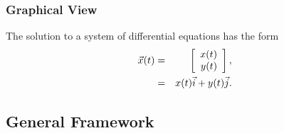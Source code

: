 \begin{frame}
    \frametitle{Graphical View}

  The solution to a system of differential equations has the form
  \begin{eqnarray*}
    \vec{x}(t) & = & \left[ \begin{array}{r} x(t) \\ y(t) \end{array} \right], \\
    & = & x(t) \vec{i} + y(t)\vec{j}.
  \end{eqnarray*}


  

\end{frame}

\subsection{General Framework}

